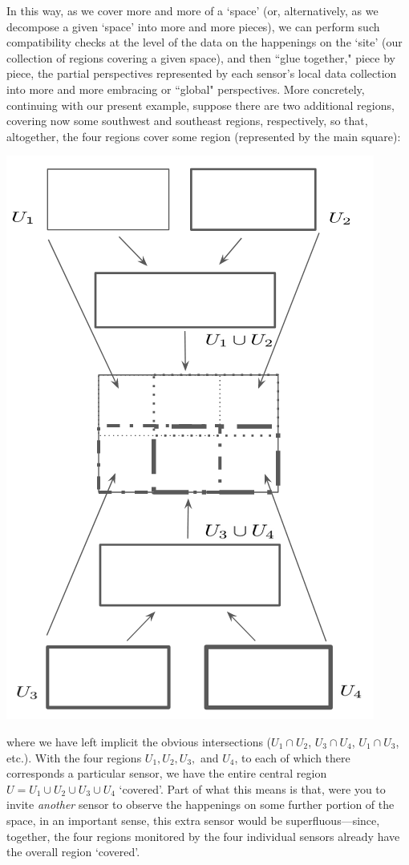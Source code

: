\documentclass[11pt]{book}
\theoremstyle{definition}
\theoremstyle{definition}
\theoremstyle{definition}
\theoremstyle{theorem}
\theoremstyle{definition}
\begin{document}
	In this way, as we cover more and more of a `space' (or, alternatively, as we decompose a given `space' into more and more pieces), we can perform such compatibility checks at the level of the data on the happenings on the `site' (our collection of regions covering a given space), and then ``glue together," piece by piece, the partial perspectives represented by each sensor's local data collection into more and more embracing or ``global" perspectives. More concretely, continuing with our present example, suppose there are two additional regions, covering now some southwest and southeast regions, respectively, so that, altogether, the four regions cover some region (represented by the main square):  
	\begin{center}
		\includegraphics[scale=0.25]{SpaceUnion.png}
	\end{center} 
	where we have left implicit the obvious intersections ($U_1 \cap U_2$, $U_3 \cap U_4$, $U_1 \cap U_3$, etc.). With the four regions $U_1, U_2, U_3,$ and $U_4$, to each of which there corresponds a particular sensor, we have the entire central region $U = U_1 \cup U_2 \cup U_3 \cup U_4$ `covered'. Part of what this means is that, were you to invite \textit{another} sensor to observe the happenings on some further portion of the space, in an important sense, this extra sensor would be superfluous---since, together, the four regions monitored by the four individual sensors already have the overall region `covered'. \par 
\end{document}
